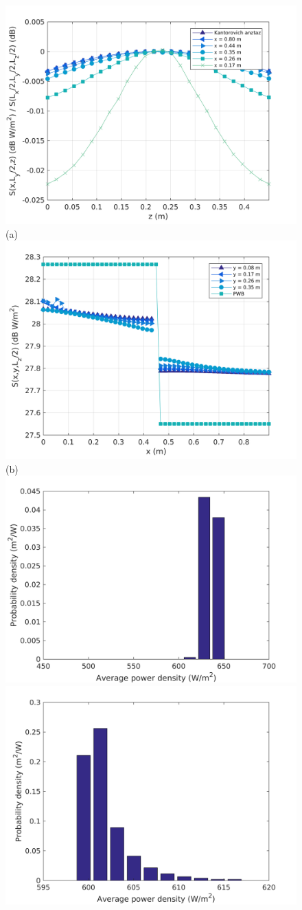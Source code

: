 \documentclass[a4paper]{article}
\numberwithin{equation}{section}
\begin{document}
\begin{figure}[ht]
\begin{center}
\includegraphics[width=0.6\linewidth]{figures/SDM_3D_DU_PowerDensityProfileZ}\\
{\footnotesize (a)}\\
\vspace{2mm}
\includegraphics[width=0.6\linewidth]{figures/SDM_3D_DU_PowerDensityProfileX}\\
{\footnotesize (b)}\\
\vspace{2mm}
\includegraphics[width=0.45\linewidth]{figures/SDM_3D_DU_PowerDensityPDF1}
\includegraphics[width=0.45\linewidth]{figures/SDM_3D_DU_PowerDensityPDF2}

\end{center}
\end{figure}
\end{document}
